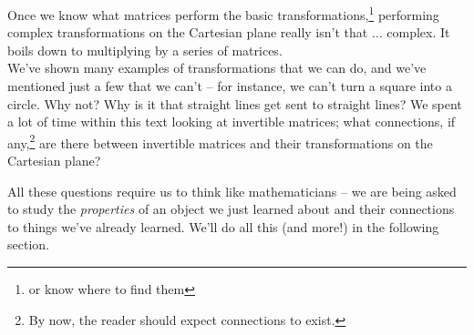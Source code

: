 \medskip

Once we know what matrices perform the basic transformations,\footnote{or know where to find them} performing complex transformations on the Cartesian plane really isn't that $\ldots$ complex. It boils down to multiplying by a series of matrices. \\

We've shown many examples of transformations that we can do, and we've mentioned just a few that we can't -- for instance, we can't turn a square into a circle. Why not? Why is it that straight lines get sent to straight lines? We spent a lot of time within this text looking at invertible matrices; what connections, if any,\footnote{By now, the reader should expect connections to exist.} are there between invertible matrices and their transformations on the Cartesian plane?

All these questions require us to think like mathematicians -- we are being asked to study the \textit{properties} of an object we just learned about and their connections to things we've already learned. We'll do all this (and more!) in the following section.\\




